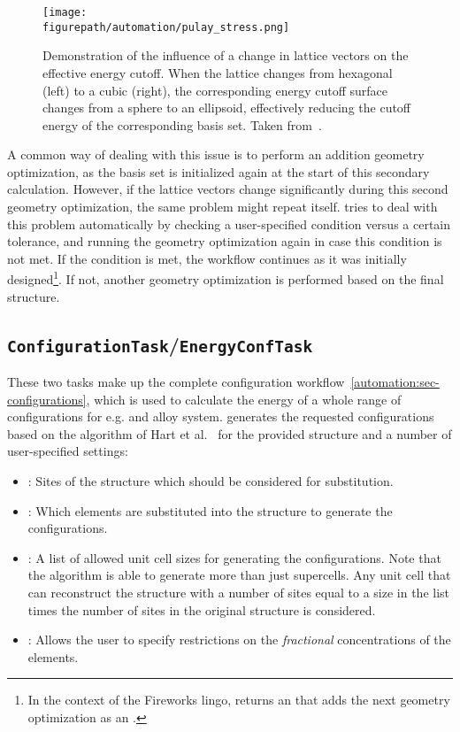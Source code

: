 \begin{refsection}
\begin{figure}
\centering
\texttt{[image: \\figurepath/automation/pulay\_stress.png]}
\caption{Demonstration of the influence of a change in lattice vectors on the effective energy cutoff. When the lattice changes from hexagonal (left) to a cubic (right), the corresponding energy cutoff surface changes from a sphere to an ellipsoid, effectively reducing the cutoff energy of the corresponding basis set. Taken from~\cite{Pulay}.}
\label{automation:fig-pulay}
\end{figure}

A common way of dealing with this issue is to perform an addition geometry optimization, as the basis set is initialized again at the start of this secondary calculation. However, if the lattice vectors change significantly during this second geometry optimization, the same problem might repeat itself.  tries to deal with this problem automatically by checking a user-specified condition versus a certain tolerance, and running the geometry optimization again in case this condition is not met. If the condition is met, the workflow continues as it was initially designed\footnote{In the context of the Fireworks lingo,  returns an  that adds the next geometry optimization as an .}. If not, another geometry optimization is performed based on the final structure.

\subsection{\texttt{ConfigurationTask}/\texttt{EnergyConfTask}} \label{automation:sec-ConfigurationTask} \label{automation:sec-EnergyConfTask}

These two tasks make up the complete configuration workflow~\ref{automation:sec-configurations}, which is used to calculate the energy of a whole range of configurations for e.g. and alloy system.  generates the requested configurations based on the algorithm of Hart et al.~\cite{Hart2005} for the provided structure and a number of user-specified settings:

\begin{itemize}
\item {}: Sites of the structure which should be considered for substitution.
\item {}: Which elements are substituted into the structure to generate the configurations.
\item {} : A list of allowed unit cell sizes for generating the configurations. Note that the algorithm is able to generate more than just supercells. Any unit cell that can reconstruct the structure with a number of sites equal to a size in the list times the number of sites in the original structure is considered.
\item {}: Allows the user to specify restrictions on the \textit{fractional} concentrations of the elements.
\end{itemize}


\end{refsection}
